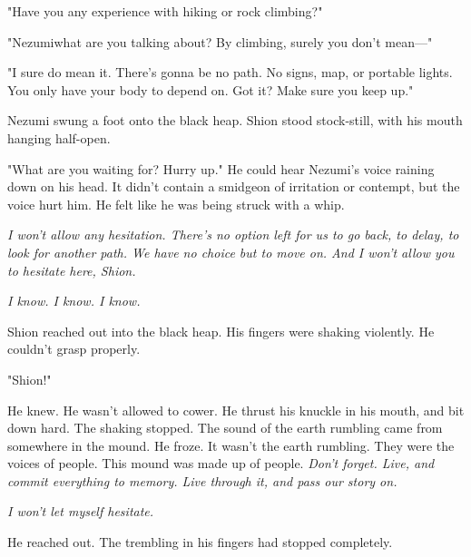 "Have you any experience with hiking or rock climbing?"

"Nezumi\el what are you talking about\el ? By climbing, surely you don't
mean---"

"I sure do mean it. There's gonna be no path. No signs, map, or portable
lights. You only have your body to depend on. Got it? Make sure you keep
up."

Nezumi swung a foot onto the black heap. Shion stood stock-still, with
his mouth hanging half-open.

"What are you waiting for? Hurry up." He could hear Nezumi's voice
raining down on his head. It didn't contain a smidgeon of irritation or
contempt, but the voice hurt him. He felt like he was being struck with
a whip.

\emph{I won't allow any hesitation. There's no option left for us to go back,
to delay, to look for another path. We have no choice but to move on.
And I won't allow you to hesitate here, Shion.}

\emph{I know. I know. I know.}

Shion reached out into the black heap. His fingers were shaking
violently. He couldn't grasp properly.

"Shion!"

He knew. He wasn't allowed to cower. He thrust his knuckle in his mouth,
and bit down hard. The shaking stopped. The sound of the earth rumbling
came from somewhere in the mound. He froze. It wasn't the earth
rumbling. They were the voices of people. This mound was made up of
people. \emph{Don't forget. Live, and commit everything to memory. Live
through it, and pass our story on.}

\emph{I won't let myself hesitate.}

He reached out. The trembling in his fingers had stopped completely.